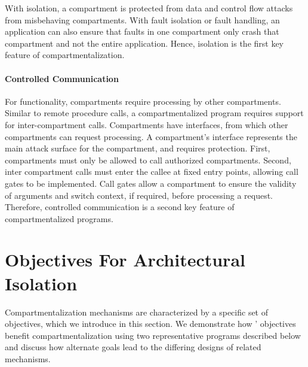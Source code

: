 With isolation, a compartment is protected from data and control flow attacks
from misbehaving compartments.
With fault isolation or fault handling, an application can also ensure that
faults in one compartment only crash that compartment and not the entire 
application.
Hence, isolation is the first key feature of compartmentalization.

\paragraph{Controlled Communication}
For functionality, compartments require processing by other compartments.
Similar to remote procedure calls, a compartmentalized program requires support
for inter-compartment calls.
Compartments have interfaces, from which other compartments can request 
processing.
A compartment's interface represents the main attack surface for the
compartment, and requires protection.
First, compartments must only be allowed to call authorized compartments.
Second, inter compartment calls must enter the callee at fixed entry points,
allowing call gates to be implemented.
Call gates allow a compartment to ensure the validity of arguments and
switch context, if required, before processing a request.
Therefore, controlled communication is a second key feature of 
compartmentalized programs.

\section{Objectives For Architectural Isolation}
\label{sec:seccells:reqs}

Compartmentalization mechanisms are characterized by a specific set of 
objectives, which we introduce in this section.
We demonstrate how \seccells' objectives benefit compartmentalization
using two representative programs described below and
discuss how alternate goals lead to the differing designs
of related mechanisms.

